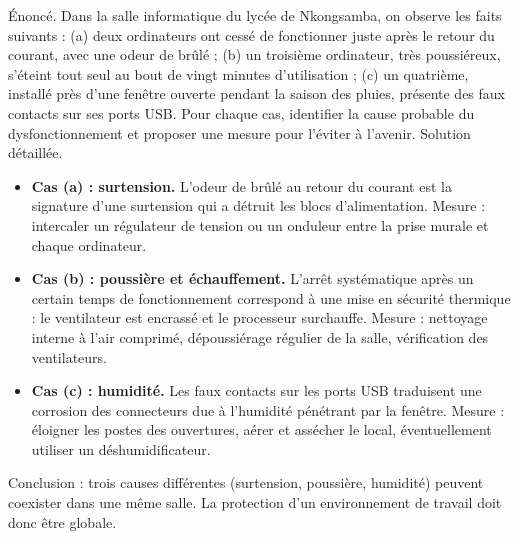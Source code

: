 \documentclass[11pt]{article}
\begin{document}
\begin{exoresolu}
Énoncé. Dans la salle informatique du lycée de Nkongsamba, on observe les faits suivants : (a) deux ordinateurs ont cessé de fonctionner juste après le retour du courant, avec une odeur de brûlé ; (b) un troisième ordinateur, très poussiéreux, s'éteint tout seul au bout de vingt minutes d'utilisation ; (c) un quatrième, installé près d'une fenêtre ouverte pendant la saison des pluies, présente des faux contacts sur ses ports USB. Pour chaque cas, identifier la cause probable du dysfonctionnement et proposer une mesure pour l'éviter à l'avenir.
\tcblower
Solution détaillée.
\begin{itemize}
  \item \textbf{Cas (a) : surtension.} L'odeur de brûlé au retour du courant est la signature d'une surtension qui a détruit les blocs d'alimentation. Mesure : intercaler un régulateur de tension ou un onduleur entre la prise murale et chaque ordinateur.
  \item \textbf{Cas (b) : poussière et échauffement.} L'arrêt systématique après un certain temps de fonctionnement correspond à une mise en sécurité thermique : le ventilateur est encrassé et le processeur surchauffe. Mesure : nettoyage interne à l'air comprimé, dépoussiérage régulier de la salle, vérification des ventilateurs.
  \item \textbf{Cas (c) : humidité.} Les faux contacts sur les ports USB traduisent une corrosion des connecteurs due à l'humidité pénétrant par la fenêtre. Mesure : éloigner les postes des ouvertures, aérer et assécher le local, éventuellement utiliser un déshumidificateur.
\end{itemize}
Conclusion : trois causes différentes (surtension, poussière, humidité) peuvent coexister dans une même salle. La protection d'un environnement de travail doit donc être globale.
\end{exoresolu}
\end{document}
